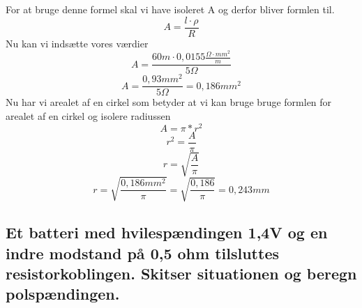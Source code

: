 For at bruge denne formel skal vi have isoleret A og derfor bliver formlen til.
\begin{equation*}
    A=\frac{l\cdot\rho}{R}
\end{equation*}
Nu kan vi indsætte vores værdier
\begin{equation*}
    A=\frac{60m\cdot0,0155\frac{\Omega\cdot mm^{2}}{m}}{5\Omega}
\end{equation*}
\begin{equation*}
    A=\frac{0,93mm^{2}}{5\Omega}=0,186mm^{2}
\end{equation*}
Nu har vi arealet af en cirkel som betyder at vi kan bruge bruge formlen for arealet af en cirkel og isolere radiussen
\begin{equation*}
    A=\pi*r^{2}
\end{equation*}
\begin{equation*}
    r^{2}=\frac{A}{\pi}
\end{equation*}
\begin{equation*}
    r=\sqrt{\frac{A}{\pi}}
\end{equation*}
\begin{equation*}
    r=\sqrt{\frac{0,186mm^{2}}{\pi}} = \sqrt{\frac{0,186}{\pi}} = 0,243mm
\end{equation*}

\subsection{Et batteri med hvilespændingen 1,4V og en indre modstand på 0,5 ohm tilsluttes resistorkoblingen. Skitser situationen og beregn polspændingen.}

\newpage